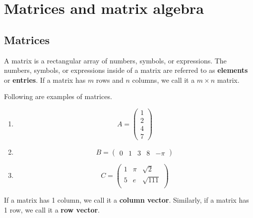 \chapter{Matrices and matrix algebra}

\section{Matrices}

\begin{definition}
    A matrix is a rectangular array of numbers, symbols, or expressions. The numbers, symbols, or expressions inside of a matrix are referred to as \textbf{elements} or \textbf{entries}. If a matrix has $m$ rows and $n$ columns, we call it a $m\times n$ matrix.
\end{definition}

\begin{example}
    Following are examples of matrices.
    
    \begin{enumerate}
        \item 
        \[
            A=
            \begin{pmatrix}
                1\\2\\4\\7
            \end{pmatrix}
        \]
        
        \item
        \[
            B=
            \begin{pmatrix}
                0&1&3&8&-\pi
            \end{pmatrix}
        \]
        
        \item
        \[
            C=
            \begin{pmatrix}
                1&\pi&\sqrt{2}\\
                5&e&\sqrt{111}\\
            \end{pmatrix}
        \]
    \end{enumerate}
\end{example}

\begin{definition}
    If a matrix has 1 column, we call it a \textbf{column vector}. Similarly, if a matrix has 1 row, we call it a \textbf{row vector}.
\end{definition}

